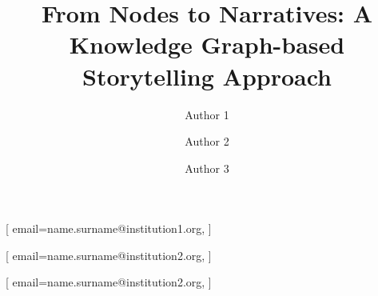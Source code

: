 \documentclass[
hf, %
]{ceurart}
\begin{document}


\title{From Nodes to Narratives: A Knowledge Graph-based Storytelling Approach}

\author[1]{Author 1}[%
 email=name.surname@institution1.org,
]
\cormark[1]

\author[2]{Author 2}[%
  email=name.surname@institution2.org,
]
\cormark[1]

\author[2]{Author 3}[%
  email=name.surname@institution2.org,
]

\address[1]{Institution 1, City 1, Country 1}

\address[2]{Institution 2, City 2, Country 2}











\end{document}

